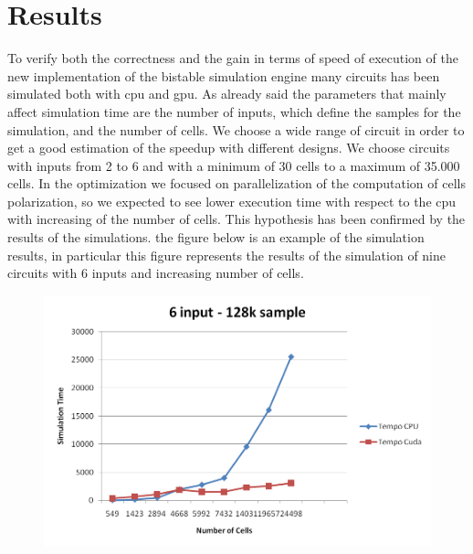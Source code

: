 \chapter{Results}\label{sec:results}
To verify both the correctness and the gain in terms of speed of execution of the new implementation of the bistable simulation engine many circuits has been simulated both with cpu and gpu.
As already said the parameters that mainly affect simulation time are the number of inputs, which define the samples for the simulation, and the number of cells. We choose a wide range of circuit in order to get a good estimation of the speedup with different designs. We choose circuits with inputs from 2 to 6 and with a minimum of 30 cells to a maximum of 35.000 cells. \newline
In the optimization we focused on parallelization of the computation of cells polarization, so we expected to see lower execution time with respect to the cpu with increasing of the number of cells. This hypothesis has been confirmed by the results of the simulations. the figure below is an example of the simulation results, in particular this figure represents the results of the simulation of nine circuits with 6 inputs and increasing number of cells.

\begin{figure}
\centering
\includegraphics[scale=0.6]{img/graph5.png}
\label{graph5}
\end{figure}

